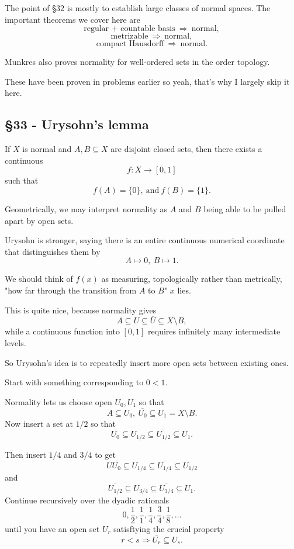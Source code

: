 \documentclass[11pt]{article}
\begin{document}
The point of \S$32$ is mostly to 
establish large classes of normal spaces. 
The important theorems we cover here are 
\[
    \text{regular + countable basis} \ \Rightarrow \ 
    \text{normal}, 
\]
\[
    \text{metrizable} \ \Rightarrow \ \text{normal}, 
\]
\[
    \text{compact Hausdorff} \ \Rightarrow \ \text{normal}.
\]

Munkres also proves normality for 
well-ordered sets in the order topology. 

These have been proven in problems earlier 
so yeah, that's why I largely skip it here.  

\subsection{\S 33 - Urysohn's lemma} 
\begin{thm}
    If $X$ is normal and $A,B\subseteq X$ are 
    disjoint closed sets, then there exists 
    a continuous 
    \[
        f : X \to [0,1]
    \]
    such that 
    \[
        f(A) = \{0\}, \ \text{and} \ f(B) = \{1\}. 
    \]
\end{thm}

Geometrically, we may interpret normality  
as $A$ and $B$ being able to be pulled 
apart by open sets. 

Urysohn is stronger, saying there 
is an entire continuous 
numerical coordinate that distinguishes them by 
\[
    A \mapsto 0, \ B \mapsto 1. 
\] 

We should think of $f(x)$ as measuring, topologically 
rather than metrically, "how far through the 
transition from $A$ to $B$" $x$ lies. 

This is quite nice, because normality gives 
\[
    A \subseteq U \subseteq \overline U \subseteq 
    X \setminus B, 
\]
while a continuous 
function into $[0,1]$ requires infinitely 
many intermediate levels. 

So Urysohn's idea is to repeatedly 
insert more open sets between 
existing ones. 

Start with something corresponding to 
$0 < 1$. 

Normality lets us choose open $U_0, U_1$ so that 
\[
    A \subseteq U_0, \ \overline{U_0} \subseteq U_1 
    = X \setminus B. 
\]
Now insert a set at $1/2$ so that 
\[
    \overline{U_0} \subseteq U_{1/2} 
    \subseteq \overline{U_{1/2}} \subseteq U_1. 
\]

Then insert $1/4$ and $3/4$ to get 
\[
    U\overline{U_0} \subseteq U_{1/4} 
    \subseteq \overline{U_{1/4}} \subseteq U_{1/2} 
\]
and 
\[
    \overline{U_{1/2}} \subseteq U_{3/4} 
    \subseteq \overline{U_{3/4}} 
    \subseteq U_1. 
\]
Continue recursively over the dyadic rationals 
\[
    0, \frac{1}{2},
    \frac{1}{1},\frac{1}{4},\frac{3}{4},\frac{1}{8}, 
    \ldots
\]
until you have an open set $U_r$ satisftying the 
crucial property 
\[
    r < s \Rightarrow \overline{U_r} \subseteq U_s. 
\]
\end{document}
